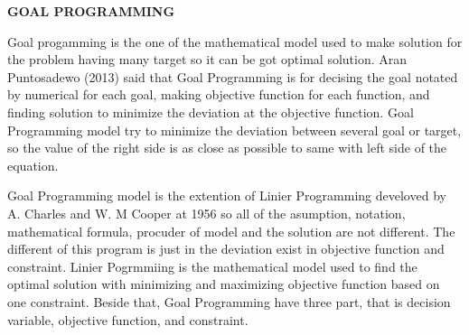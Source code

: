 \documentclass[a4paper, 12pt]{article}
\numberwithin{lemma}{section}
\begin{document}
	\begin{center}
		\textbf{GOAL PROGRAMMING}
	\end{center}

	Goal progamming is the one of the mathematical model used to make solution for the problem having many target so it can be got optimal solution. Aran Puntosadewo (2013) said that Goal Programming is for decising the goal notated by numerical for each goal, making objective function for each function, and finding solution to minimize the deviation at the objective function. Goal Programming model try to minimize the deviation between several goal or target, so the value of the right side is as close as possible to same with left side of the equation. 
	
	Goal Programming model is the extention of Linier Programming develoved by A. Charles and W. M Cooper at 1956 so all of the asumption, notation, mathematical formula, procuder of model and the solution are not different. The different of this program is just in the deviation exist in objective function and constraint. Linier Pogrmmiing is the mathematical model used to find the optimal solution with minimizing and maximizing objective function based on one constraint. Beside that, Goal Programming have three part, that is decision variable, objective function, and constraint.
	
\end{document}
